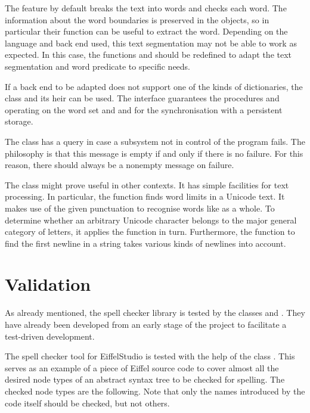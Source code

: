 \documentclass[paper=a4]{scrartcl}
\begin{document}
The feature  by default breaks the text into words and checks each word. The information about the word boundaries is preserved in the  objects, so in particular their function  can be useful to extract the word. Depending on the language and back end used, this text segmentation may not be able to work as expected. In this case, the functions  and  should be redefined to adapt the text segmentation and word predicate to specific needs.

If a back end to be adapted does not support one of the kinds of dictionaries, the class  and its heir  can be used. The interface guarantees the procedures  and  operating on the word set and  and  for the synchronisation with a persistent storage.

The class  has a query  in case a subsystem not in control of the program fails. The philosophy is that this message is empty if and only if there is no failure. For this reason, there should always be a nonempty message on failure.

The class  might prove useful in other contexts. It has simple facilities for text processing. In particular, the function  finds word limits in a Unicode text. It makes use of the given punctuation to recognise words like  as a whole. To determine whether an arbitrary Unicode character belongs to the major general category of letters, it applies the function  in turn. Furthermore, the function  to find the first newline in a string takes various kinds of newlines into account.

\section{Validation}

As already mentioned, the spell checker library is tested by the classes  and . They have already been developed from an early stage of the project to facilitate a test-driven development.

The spell checker tool for EiffelStudio is tested with the help of the class . This serves as an example of a piece of Eiffel source code to cover almost all the desired node types of an abstract syntax tree to be checked for spelling. The checked node types are the following. Note that only the names introduced by the code itself should be checked, but not others.
\end{document}
